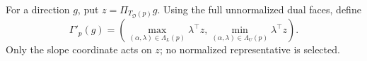 For a direction \(g\), put \(z=\Pi_{T_{\mathfrak O}(p)}g\).  Using the full unnormalized dual faces, define
\[
\Gamma'_p(g)=\left(
\max_{(\alpha,\lambda)\in\Lambda_L(p)}\lambda^{\top}z,
\min_{(\alpha,\lambda)\in\Lambda_U(p)}\lambda^{\top}z
\right).
\]
Only the slope coordinate acts on \(z\); no normalized representative is selected.